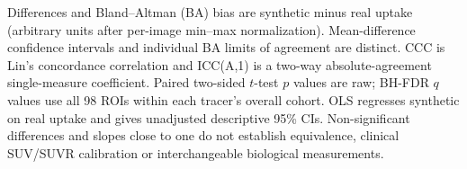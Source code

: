 \documentclass{article}
\begin{document}
\begin{landscape}
\begin{table}[p]
{\begin{tabular}{llrccccccccc}
\bottomrule
\end{tabular}}
\par\smallskip\footnotesize
Differences and Bland--Altman (BA) bias are synthetic minus real uptake (arbitrary units after per-image min--max normalization). Mean-difference confidence intervals and individual BA limits of agreement are distinct. CCC is Lin's concordance correlation and ICC(A,1) is a two-way absolute-agreement single-measure coefficient. Paired two-sided $t$-test $p$ values are raw; BH-FDR $q$ values use all 98 ROIs within each tracer's overall cohort. OLS regresses synthetic on real uptake and gives unadjusted descriptive 95\% CIs. Non-significant differences and slopes close to one do not establish equivalence, clinical SUV/SUVR calibration or interchangeable biological measurements.
\end{table}
\end{landscape}

\end{document}
